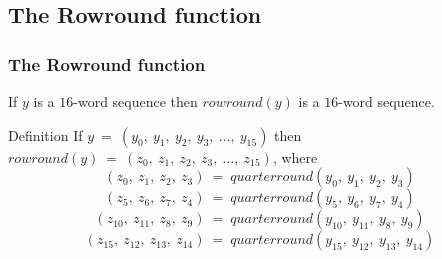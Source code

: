 \subsection{The Rowround function}

\begin{frame}
\frametitle{The Rowround function}

If $y$ is a $16$-word sequence then $rowround(y)$ is a $16$-word sequence.

\begin{block}{Definition}
If $y \ = \ (y_0, \ y_1, \ y_2, \ y_3, \ \ldots, \ y_{15})$ then ${rowround(y)} \ = \ (z_0, \ z_1, \ z_2, \ z_3, \ \ldots, \ z_{15})$, where 
$$(z_0, \ z_1, \ z_2, \ z_3) \ = \ quarterround (y_0, \ y_1, \ y_2, \ y_3)$$
$$(z_5, \ z_6, \ z_7, \ z_4) \ = \ quarterround (y_5, \ y_6, \ y_7, \ y_4)$$
$$(z_{10}, \ z_{11}, \ z_8, \ z_9) \ = \ quarterround (y_{10}, \ y_{11}, \ y_{8}, \ y_9)$$
$$(z_{15}, \ z_{12}, \ z_{13}, \ z_{14}) \ = \ quarterround (y_{15}, \ y_{12}, \ y_{13}, \ y_{14})$$
\end{block}
\end{frame}
